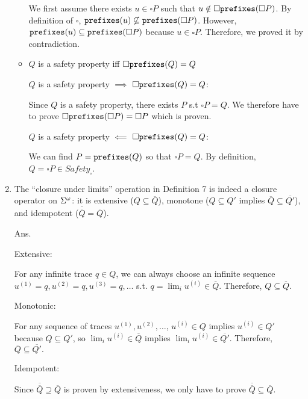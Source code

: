 \documentclass{article}
\begin{document}
\begin{enumerate}
\begin{itemize}
We first assume there exists $u \in \square P$ such that
$u \notin \square \mathtt{prefixes}(\square P)$.
By definition of $\square$, $\mathtt{prefixes}(u) \not\subseteq \mathtt{prefixes}(\square P)$. 
However, $\mathtt{prefixes}(u) \subseteq \mathtt{prefixes}(\square P)$ because $u \in \square P$.
Therefore, we proved it by contradiction.

\item $Q$ is a safety property iff $\square \mathtt{prefixes}(Q) = Q$

\medskip
$Q$ is a safety property $\implies$ $\square \mathtt{prefixes}(Q) = Q$:

Since $Q$ is a safety property, there exists $P$ s.t $\square P = Q$.
We therefore have to prove $\square \mathtt{prefixes}(\square P) = \square P$
which is proven.

\medskip
$Q$ is a safety property $\impliedby$ $\square \mathtt{prefixes}(Q) = Q$:

We can find $P = \mathtt{prefixes}(Q)$ so that $\square P = Q$.
By definition, $Q = \square P \in Safety_{\square}$.
 

\end{itemize}


\item The ``closure under limits'' operation in Definition 7 is indeed a closure
operator on $\Sigma^\omega$: it is extensive ($Q \subseteq \overline{Q}$),
monotone ($Q\subseteq Q'$ implies $\overline{Q} \subseteq \overline{Q'}$),
and idempotent ($\overline{\overline{Q}} = \overline{Q}$).

Ans.

Extensive:

For any infinite trace $q \in Q$,
we can always choose an infinite sequence $u^{(1)}=q, u^{(2)}=q, u^{(3)}=q, \dots$
s.t. $q = \lim_i u^{(i)} \in \overline{Q}$.
Therefore, $Q \subseteq \overline{Q}$.

\medskip

Monotonic:

For any sequence of traces $u^{(1)}, u^{(2)},\dots$,
$u^{(i)} \in Q$ implies $u^{(i)} \in Q'$ because $Q \subseteq Q'$,
so $\lim_i u^{(i)} \in \overline{Q}$ implies
$\lim_i u^{(i)} \in \overline{Q'}$.
Therefore, $\overline{Q} \subseteq \overline{Q'}.$

\medskip

Idempotent:

Since $\overline{\overline{Q}} \supseteq \overline{Q}$ is proven by extensiveness,
we only have to prove $\overline{\overline{Q}} \subseteq \overline{Q}$.


\end{enumerate}
\end{document}
